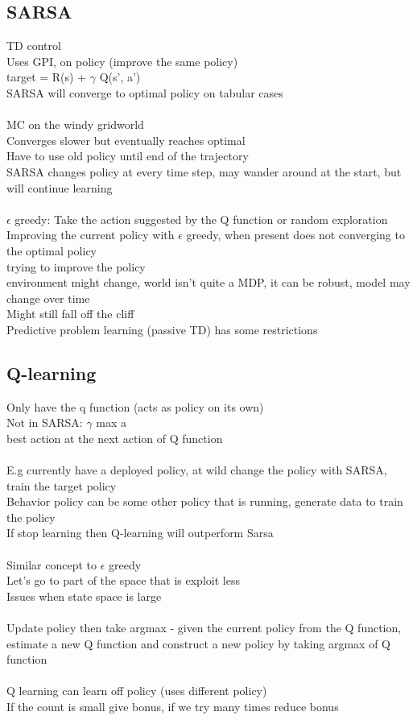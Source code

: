 \documentclass[11pt]{article}
\begin{document}
\subsection*{SARSA}
TD control\\
Uses GPI, on policy (improve the same policy)\\
target = R(s) + $\gamma$ Q(s', a')\\
SARSA will converge to optimal policy on tabular cases\\
\\
MC on the windy gridworld\\
Converges slower but eventually reaches optimal\\
Have to use old policy until end of the trajectory
\\
SARSA changes policy at every time step, may wander around at the start, but will continue learning
\\\\
$\epsilon$ greedy: Take the action suggested by the Q function or random exploration
\\
Improving the current policy with $\epsilon$ greedy, when present does not converging to the optimal policy
\\
trying to improve the policy\\
environment might change, world isn't quite a MDP, it can be robust, model may change over time \\
Might still fall off the cliff
\\
Predictive problem learning (passive TD) has some restrictions 
\subsection*{Q-learning}
Only have the q function (acts as policy on its own)\\
Not in SARSA: $\gamma$  max a \\
best action at the next action of Q function\\
\\
E.g currently have a deployed policy, at wild change the policy with SARSA, train the target policy\\
Behavior policy can be some other policy that is running, generate data to train the policy
\\
If stop learning then Q-learning will outperform Sarsa
\\
\\
Similar concept to $\epsilon$ greedy\\
Let's go to part of the space that is exploit less\\
Issues when state space is large\\
\\
Update policy then take argmax - given the current policy from the Q function, estimate a new Q function and construct a new policy by taking argmax of Q function\\\\
Q learning can learn off policy (uses different policy)\\
If the count is small give bonus, if we try many times reduce bonus\\
\\
\end{document}
